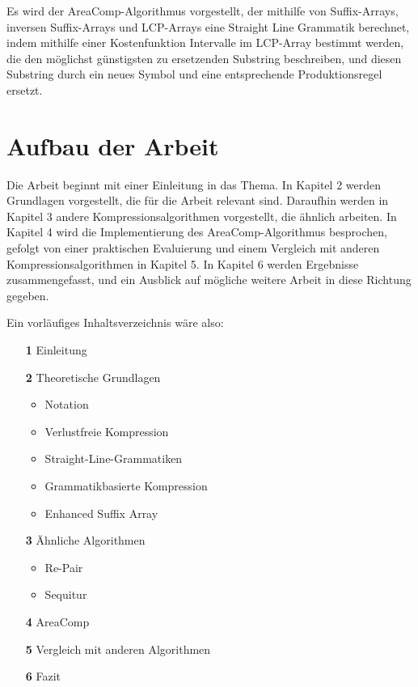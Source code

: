 Es wird der AreaComp-Algorithmus vorgestellt, der mithilfe von Suffix-Arrays, inversen Suffix-Arrays und LCP-Arrays \cite{manber_suffix_1993} eine Straight Line Grammatik berechnet, indem mithilfe einer Kostenfunktion Intervalle im LCP-Array bestimmt werden, die den möglichst günstigsten zu ersetzenden Substring beschreiben, und diesen Substring durch ein neues Symbol und eine entsprechende Produktionsregel ersetzt.

\section{Aufbau der Arbeit}

Die Arbeit beginnt mit einer Einleitung in das Thema. In Kapitel 2 werden Grundlagen vorgestellt, die für die Arbeit relevant sind. Daraufhin werden in Kapitel 3 andere Kompressionsalgorithmen vorgestellt, die ähnlich arbeiten. In Kapitel 4 wird die Implementierung des AreaComp-Algorithmus besprochen, gefolgt von einer praktischen Evaluierung und einem Vergleich mit anderen Kompressionsalgorithmen in Kapitel 5. In Kapitel 6 werden Ergebnisse zusammengefasst, und ein Ausblick auf mögliche weitere Arbeit in diese Richtung gegeben.

Ein vorläufiges Inhaltsverzeichnis wäre also:

\begin{enumerate}
    \item[\textbf{1}] Einleitung
    \item[\textbf{2}] Theoretische Grundlagen
    \begin{itemize}
        \item Notation
        \item Verlustfreie Kompression
        \item Straight-Line-Grammatiken
        \item Grammatikbasierte Kompression
        \item Enhanced Suffix Array
    \end{itemize}
    \item[\textbf{3}] Ähnliche Algorithmen
    \begin{itemize}
        \item Re-Pair
        \item Sequitur
    \end{itemize}
    \item[\textbf{4}] AreaComp
    \item[\textbf{5}] Vergleich mit anderen Algorithmen
    \item[\textbf{6}] Fazit
\end{enumerate}